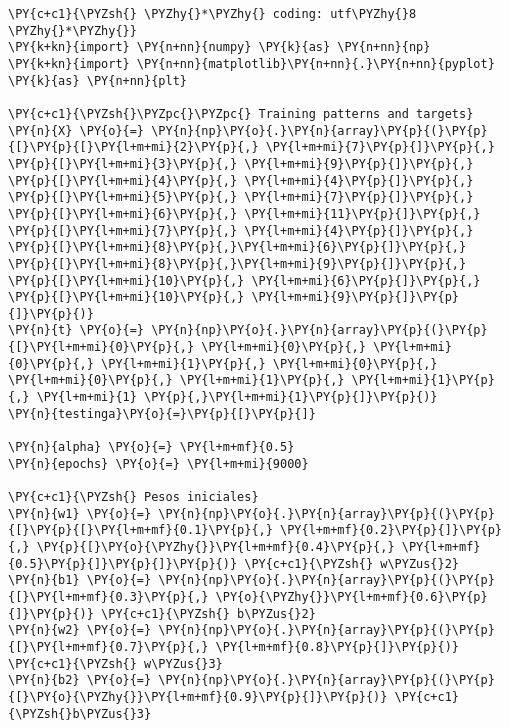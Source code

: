 \begin{tcolorbox}[breakable, size=fbox, boxrule=1pt, pad at break*=1mm,colback=cellbackground, colframe=cellborder]
\begin{Verbatim}[commandchars=\\\{\}]
\PY{c+c1}{\PYZsh{} \PYZhy{}*\PYZhy{} coding: utf\PYZhy{}8 \PYZhy{}*\PYZhy{}}
\PY{k+kn}{import} \PY{n+nn}{numpy} \PY{k}{as} \PY{n+nn}{np}
\PY{k+kn}{import} \PY{n+nn}{matplotlib}\PY{n+nn}{.}\PY{n+nn}{pyplot} \PY{k}{as} \PY{n+nn}{plt}
 
\PY{c+c1}{\PYZsh{}\PYZpc{}\PYZpc{} Training patterns and targets}
\PY{n}{X} \PY{o}{=} \PY{n}{np}\PY{o}{.}\PY{n}{array}\PY{p}{(}\PY{p}{[}\PY{p}{[}\PY{l+m+mi}{2}\PY{p}{,} \PY{l+m+mi}{7}\PY{p}{]}\PY{p}{,} \PY{p}{[}\PY{l+m+mi}{3}\PY{p}{,} \PY{l+m+mi}{9}\PY{p}{]}\PY{p}{,} \PY{p}{[}\PY{l+m+mi}{4}\PY{p}{,} \PY{l+m+mi}{4}\PY{p}{]}\PY{p}{,} \PY{p}{[}\PY{l+m+mi}{5}\PY{p}{,} \PY{l+m+mi}{7}\PY{p}{]}\PY{p}{,} \PY{p}{[}\PY{l+m+mi}{6}\PY{p}{,} \PY{l+m+mi}{11}\PY{p}{]}\PY{p}{,} \PY{p}{[}\PY{l+m+mi}{7}\PY{p}{,} \PY{l+m+mi}{4}\PY{p}{]}\PY{p}{,} \PY{p}{[}\PY{l+m+mi}{8}\PY{p}{,}\PY{l+m+mi}{6}\PY{p}{]}\PY{p}{,} \PY{p}{[}\PY{l+m+mi}{8}\PY{p}{,}\PY{l+m+mi}{9}\PY{p}{]}\PY{p}{,} \PY{p}{[}\PY{l+m+mi}{10}\PY{p}{,} \PY{l+m+mi}{6}\PY{p}{]}\PY{p}{,} \PY{p}{[}\PY{l+m+mi}{10}\PY{p}{,} \PY{l+m+mi}{9}\PY{p}{]}\PY{p}{]}\PY{p}{)}
\PY{n}{t} \PY{o}{=} \PY{n}{np}\PY{o}{.}\PY{n}{array}\PY{p}{(}\PY{p}{[}\PY{l+m+mi}{0}\PY{p}{,} \PY{l+m+mi}{0}\PY{p}{,} \PY{l+m+mi}{0}\PY{p}{,} \PY{l+m+mi}{1}\PY{p}{,} \PY{l+m+mi}{0}\PY{p}{,} \PY{l+m+mi}{0}\PY{p}{,} \PY{l+m+mi}{1}\PY{p}{,} \PY{l+m+mi}{1}\PY{p}{,} \PY{l+m+mi}{1} \PY{p}{,}\PY{l+m+mi}{1}\PY{p}{]}\PY{p}{)}
\PY{n}{testinga}\PY{o}{=}\PY{p}{[}\PY{p}{]}

\PY{n}{alpha} \PY{o}{=} \PY{l+m+mf}{0.5}
\PY{n}{epochs} \PY{o}{=} \PY{l+m+mi}{9000}
 
\PY{c+c1}{\PYZsh{} Pesos iniciales}
\PY{n}{w1} \PY{o}{=} \PY{n}{np}\PY{o}{.}\PY{n}{array}\PY{p}{(}\PY{p}{[}\PY{p}{[}\PY{l+m+mf}{0.1}\PY{p}{,} \PY{l+m+mf}{0.2}\PY{p}{]}\PY{p}{,} \PY{p}{[}\PY{o}{\PYZhy{}}\PY{l+m+mf}{0.4}\PY{p}{,} \PY{l+m+mf}{0.5}\PY{p}{]}\PY{p}{]}\PY{p}{)} \PY{c+c1}{\PYZsh{} w\PYZus{}2}
\PY{n}{b1} \PY{o}{=} \PY{n}{np}\PY{o}{.}\PY{n}{array}\PY{p}{(}\PY{p}{[}\PY{l+m+mf}{0.3}\PY{p}{,} \PY{o}{\PYZhy{}}\PY{l+m+mf}{0.6}\PY{p}{]}\PY{p}{)} \PY{c+c1}{\PYZsh{} b\PYZus{}2}
\PY{n}{w2} \PY{o}{=} \PY{n}{np}\PY{o}{.}\PY{n}{array}\PY{p}{(}\PY{p}{[}\PY{l+m+mf}{0.7}\PY{p}{,} \PY{l+m+mf}{0.8}\PY{p}{]}\PY{p}{)} \PY{c+c1}{\PYZsh{} w\PYZus{}3}
\PY{n}{b2} \PY{o}{=} \PY{n}{np}\PY{o}{.}\PY{n}{array}\PY{p}{(}\PY{p}{[}\PY{o}{\PYZhy{}}\PY{l+m+mf}{0.9}\PY{p}{]}\PY{p}{)} \PY{c+c1}{\PYZsh{}b\PYZus{}3}
\end{Verbatim}
\end{tcolorbox}

